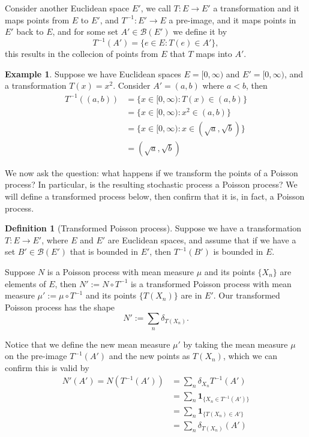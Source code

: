 \documentclass[11pt, oneside]{article}   	%
\theoremstyle{definition}
\newtheorem{definition}{Definition}[section]
\newtheorem{example}{Example}[section]
\theoremstyle{remark}
\begin{document}
Consider another Euclidean space $E'$, we call $T : E \to E'$ a transformation and it maps points from $E$ to $E'$, and $T^{-1} : E' \to E$ a pre-image, and it maps points in $E'$ back to $E$, and for some set $A' \in \mathcal{B}(E')$ we define it by 
$$T^{-1}(A') = \{e \in E : T(e) \in A'\},$$
this results in the collecion of points from $E$ that $T$ maps into $A'$.

\begin{example}
Suppose we have Euclidean spaces $E=[0, \infty)$ and $E'=[0, \infty)$, and a transformation $T(x) = x^2$. Consider $A'=(a,b)$  where $a < b$, then
\begin{align*}
  T^{-1}((a,b)) &= \{x \in [0, \infty) : T(x) \in (a,b) \} \\
		&= \{x \in [0, \infty) : x^2 \in (a,b) \} \\
		&= \{x \in [0, \infty) : x \in (\sqrt{a},\sqrt{b}) \} \\
		&= (\sqrt{a}, \sqrt{b})
\end{align*}
\end{example}

We now ask the question: what happens if we transform the points of a Poisson process? In particular, is the resulting stochastic process a Poisson process? We will define a transformed process below, then confirm that it is, in fact, a Poisson process.

\begin{definition}[Transformed Poisson process] \label{tpp}
  Suppose we have a transformation $T : E \to E'$, where $E$ and $E'$ are Euclidean spaces, and assume that if we have a set $B' \in \mathcal{B}(E')$ that is bounded in $E'$, then $T^{-1} (B')$ is bounded in $E$.

  Suppose $N$ is a Poisson process with mean measure $\mu$ and its points $\{X_n\}$ are elements of $E$, then $N' := N \circ T^{-1}$ is a transformed Poisson process with mean measure $\mu':= \mu \circ T^{-1}$ and its points $\{T(X_n)\}$ are in $E'$. Our transformed Poisson process has the shape $$N' := \sum_{n} \delta_{T(X_n)}.$$
\end{definition}

Notice that we define the new mean measure $\mu'$ by taking the mean measure $\mu$ on the pre-image $T^{-1}(A')$ and the new points as ${T(X_n)}$, which we can confirm this is valid by
\begin{align*}
  N'(A') = N(T^{-1} (A')) &= \sum_{n} \delta_{X_n} T^{-1} (A') \\
			  &= \sum_{n} \mathbf{1}_{\{X_n \in T^{-1}(A')\}} \\
			  &= \sum_{n} \mathbf{1}_{\{T(X_n) \in A'\}} \\
			  &= \sum_{n} \delta_{T(X_n)} (A') \\
\end{align*}
\end{document}
